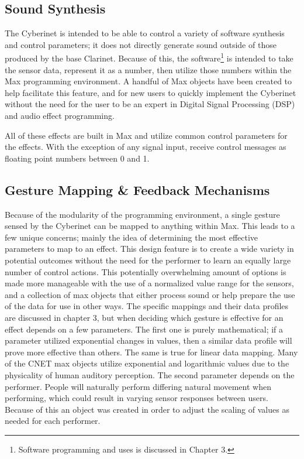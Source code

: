 \subsection{Sound Synthesis} %

The Cyberinet is intended to be able to control a variety of software synthesis and control parameters; it does not directly generate sound outside of those produced by the base Clarinet. Because of this, the software\footnote{Software programming and uses is discussed in Chapter 3.} is intended to take the sensor data, represent it as a number, then utilize those numbers within the Max programming environment. A handful of Max objects have been created to help facilitate this feature, and for new users to quickly implement the Cyberinet without the need for the user to be an expert in Digital Signal Processing (DSP) and audio effect programming.

All of these effects are built in Max and utilize common control parameters for the effects. With the exception of any signal input, receive control messages as floating point numbers between 0 and 1.

\subsection{Gesture Mapping \& Feedback Mechanisms}

Because of the modularity of the programming environment, a single gesture sensed by the Cyberinet can be mapped to anything within Max. This leads to a few unique concerns; mainly the idea of determining the most effective parameters to map to an effect. This design feature is to create a wide variety in potential outcomes without the need for the performer to learn an equally large number of control actions. This potentially overwhelming amount of options is made more manageable with the use of a normalized value range for the sensors, and a collection of max objects that either process sound or help prepare the use of the data for use in other ways. The specific mappings and their data profiles are discussed in chapter 3, but when deciding which gesture is effective for an effect depends on a few parameters. The first one is purely mathematical; if a parameter utilized exponential changes in values, then a similar data profile will prove more effective than others. The same is true for linear data mapping. Many of the CNET max objects utilize exponential and logarithmic values due to the physicality of human auditory perception. The second parameter depends on the performer. People will naturally perform differing natural movement when performing\cite{wanderleyClarinetGesture2005}, which could result in varying sensor responses between users. Because of this an object was created in order to adjust the scaling of values as needed for each performer.

